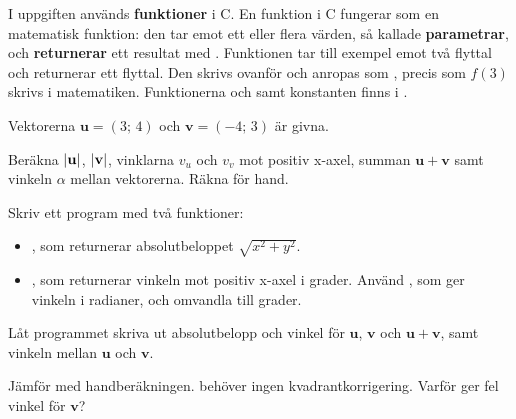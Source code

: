 I uppgiften används \textbf{funktioner} i C. En funktion i C fungerar som en matematisk funktion:
den tar emot ett eller flera värden, så kallade \textbf{parametrar}, och \textbf{returnerar} ett
resultat med . Funktionen  tar till exempel
emot två flyttal och returnerar ett flyttal. Den skrivs ovanför  och anropas som
, precis som $f(3)$ skrivs i matematiken. Funktionerna  och
 samt konstanten  finns i .

Vektorerna $\mathbf{u} = (3;\, 4)$ och $\mathbf{v} = (-4;\, 3)$ är givna.
\begin{parts}
  \item Beräkna $\lvert\mathbf{u}\rvert$, $\lvert\mathbf{v}\rvert$, vinklarna $v_u$ och $v_v$ mot positiv
    x-axel, summan $\mathbf{u} + \mathbf{v}$ samt vinkeln $\alpha$ mellan vektorerna. Räkna för
    hand.
  \item Skriv ett program med två funktioner:
    \begin{itemize}
      \item {}, som returnerar absolutbeloppet
        $\sqrt{x^2 + y^2}$.
      \item {}, som returnerar vinkeln mot positiv
        x-axel i grader. Använd , som ger vinkeln i radianer, och omvandla till
        grader.
    \end{itemize}
    Låt programmet skriva ut absolutbelopp och vinkel för $\mathbf{u}$, $\mathbf{v}$ och
    $\mathbf{u} + \mathbf{v}$, samt vinkeln mellan $\mathbf{u}$ och $\mathbf{v}$.
  \item Jämför med handberäkningen.  behöver ingen kvadrantkorrigering. Varför ger
     fel vinkel för $\mathbf{v}$?
\end{parts}
